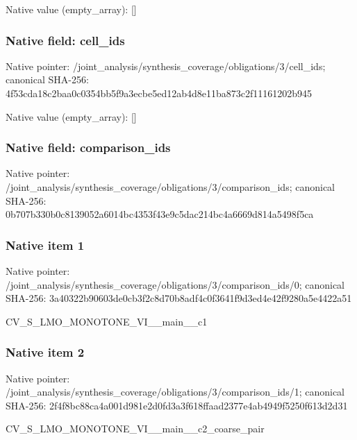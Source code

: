 \documentclass[10pt,a4paper]{article}
\begin{document}
Native value (empty\_\allowbreak{}array): []

\subsubsection{Native field: cell\_\allowbreak{}ids}
Native pointer: /joint\_\allowbreak{}analysis/synthesis\_\allowbreak{}coverage/obligations/3/cell\_\allowbreak{}ids; canonical SHA-256: 4f53cda18c2baa0c0354bb5f9a3ecbe5ed12ab4d8e11ba873c2f11161202b945

Native value (empty\_\allowbreak{}array): []

\subsubsection{Native field: comparison\_\allowbreak{}ids}
Native pointer: /joint\_\allowbreak{}analysis/synthesis\_\allowbreak{}coverage/obligations/3/comparison\_\allowbreak{}ids; canonical SHA-256: 0b707b330b0c8139052a6014bc4353f43e9c5dac214bc4a6669d814a5498f5ca

\subsubsection{Native item 1}
Native pointer: /joint\_\allowbreak{}analysis/synthesis\_\allowbreak{}coverage/obligations/3/comparison\_\allowbreak{}ids/0; canonical SHA-256: 3a40322b90603de0cb3f2c8d70b8adf4c0f3641f9d3ed4e42f9280a5e4422a51

\begingroup\raggedright\sloppy CV\_\allowbreak{}S\_\allowbreak{}LMO\_\allowbreak{}MONOTONE\_\allowbreak{}VI\_\allowbreak{}\_\allowbreak{}main\_\allowbreak{}\_\allowbreak{}c1\par\endgroup

\subsubsection{Native item 2}
Native pointer: /joint\_\allowbreak{}analysis/synthesis\_\allowbreak{}coverage/obligations/3/comparison\_\allowbreak{}ids/1; canonical SHA-256: 2f4f8bc88ca4a001d981e2d0fd3a3f618ffaad2377e4ab4949f5250f613d2d31

\begingroup\raggedright\sloppy CV\_\allowbreak{}S\_\allowbreak{}LMO\_\allowbreak{}MONOTONE\_\allowbreak{}VI\_\allowbreak{}\_\allowbreak{}main\_\allowbreak{}\_\allowbreak{}c2\_\allowbreak{}coarse\_\allowbreak{}pair\par\endgroup
\end{document}
